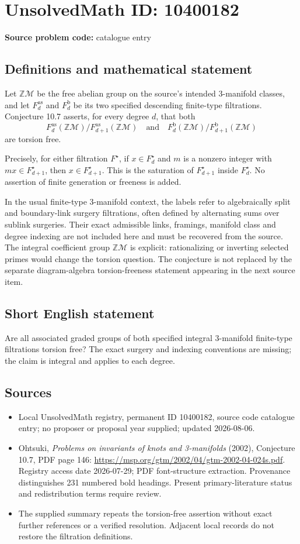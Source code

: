 \documentclass[11pt]{article}
\newcommand{\Z}{\mathbb{Z}}
\begin{document}
\section*{UnsolvedMath ID: 10400182}
\textbf{Source problem code:} catalogue entry
\subsection{Definitions and mathematical statement}
Let \(\Z\mathcal M\) be the free abelian group on the source's intended 3-manifold classes, and let \(F_d^{\mathrm{as}}\) and \(F_d^{\mathrm b}\) be its two specified descending finite-type filtrations. Conjecture 10.7 asserts, for every degree \(d\), that both
\[
 F_d^{\mathrm{as}}(\Z\mathcal M)/F_{d+1}^{\mathrm{as}}(\Z\mathcal M)
 \quad\text{and}\quad
 F_d^{\mathrm b}(\Z\mathcal M)/F_{d+1}^{\mathrm b}(\Z\mathcal M)
\]
are torsion free.

Precisely, for either filtration \(F^\star\), if \(x\in F_d^\star\) and \(m\) is a nonzero integer with \(mx\in F_{d+1}^\star\), then \(x\in F_{d+1}^\star\). This is the saturation of \(F_{d+1}^\star\) inside \(F_d^\star\). No assertion of finite generation or freeness is added.

In the usual finite-type 3-manifold context, the labels refer to algebraically split and boundary-link surgery filtrations, often defined by alternating sums over sublink surgeries. Their exact admissible links, framings, manifold class and degree indexing are not included here and must be recovered from the source. The integral coefficient group \(\Z\mathcal M\) is explicit: rationalizing or inverting selected primes would change the torsion question. The conjecture is not replaced by the separate diagram-algebra torsion-freeness statement appearing in the next source item.
\subsection{Short English statement}
Are all associated graded groups of both specified integral 3-manifold finite-type filtrations torsion free? The exact surgery and indexing conventions are missing; the claim is integral and applies to each degree.
\subsection{Sources}
\begin{itemize}
\item Local UnsolvedMath registry, permanent ID 10400182, source code catalogue entry; no proposer or proposal year supplied; updated 2026-08-06.
\item Ohtsuki, \emph{Problems on invariants of knots and 3-manifolds} (2002), Conjecture 10.7, PDF page 146: \url{https://msp.org/gtm/2002/04/gtm-2002-04-024s.pdf}. Registry access date 2026-07-29; PDF font-structure extraction. Provenance distinguishes 231 numbered bold headings. Present primary-literature status and redistribution terms require review.
\item The supplied summary repeats the torsion-free assertion without exact further references or a verified resolution. Adjacent local records do not restore the filtration definitions.
\end{itemize}
\end{document}
